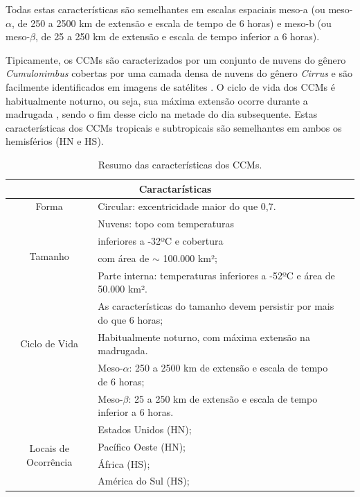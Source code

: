 Todas estas características são semelhantes em escalas espaciais meso-a  (ou meso-$\alpha$, de 250 a 2500 km de extensão e escala de tempo de 6 horas) e meso-b (ou meso-$\beta$, de 25 a 250 km de extensão e escala de tempo inferior a 6 horas).

Tipicamente, os CCMs são caracterizados por um conjunto de nuvens do gênero \textit{Cumulonimbus} cobertas por uma camada densa de nuvens do gênero \textit{Cirrus} e são facilmente identificados em imagens de satélites \cite{silvadias87}. O ciclo de vida dos CCMs é habitualmente noturno, ou seja, sua máxima extensão ocorre durante a madrugada \cite{velascofritsch87}, sendo o fim desse ciclo na metade do dia subsequente. Estas características dos CCMs tropicais e subtropicais são semelhantes em ambos os hemisférios (HN e HS).

\begin{table}[!hbp]
\caption{Resumo das características dos CCMs.}
\label{tab03}
\centering
\begin{tabular}{c|p{12cm}l}
\hline
\multicolumn{2}{c}{Caractarísticas}                                                 \\
\hline
Forma                                       & Circular: excentricidade maior do que 0,7.\\
\hline
\multirow{4}{2cm}{Tamanho}                  & Nuvens: topo com temperaturas \\
                                            & inferiores a -32ºC e cobertura \\
                                            & com área de $\sim$ 100.000 km²; \\
                                            & Parte interna: temperaturas inferiores a -52ºC e área de 50.000 km².         \\
\hline
\multirow{3}{2cm}{Ciclo de Vida}            & As características do tamanho devem persistir por mais do que 6 horas;   \\
                                            & Habitualmente noturno, com máxima extensão na madrugada.                \\
\hline
\multirow{3}{2cm}{Escala}                   & Meso-$\alpha$: 250 a 2500 km de extensão e escala de tempo de 6 horas;      \\
                                            & Meso-$\beta$: 25 a 250 km de extensão e escala de tempo inferior a 6 horas. \\
\hline
\multirow{4}{2cm}{Locais de Ocorrência} & Estados Unidos (HN);                  \\
                                            & Pacífico Oeste (HN);              \\
                                            & África (HS);                      \\
                                            & América do Sul (HS);              \\
\hline
\end{tabular}
\end{table}

